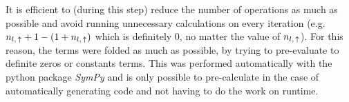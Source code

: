 It is efficient to (during this step) reduce the number of operations as much as possible and avoid running unnecessary calculations on every iteration (e.g. $n_{l,\,\uparrow} + 1 - (1 + n_{l,\,\uparrow})$ which is definitely 0, no matter the value of $n_{l,\,\uparrow}$).
For this reason, the terms were folded as much as possible, by trying to pre-evaluate to definite zeros or constants terms.
This was performed automatically with the python package \emph{SymPy} \cite{sympyPackage} and is only possible to pre-calculate in the case of automatically generating code and not having to do the work on runtime.
